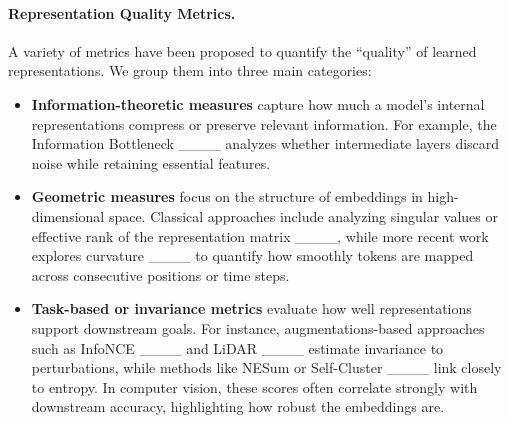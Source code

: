
\paragraph{Representation Quality Metrics.}


A variety of metrics have been proposed to quantify the ``quality'' of learned representations. We group them into three main categories:

\begin{itemize}[itemsep=1pt, topsep=0pt]
    \item \textbf{Information-theoretic measures} capture how much a model's internal representations compress or preserve relevant information. For example, the Information Bottleneck ____ analyzes whether intermediate layers discard noise while retaining essential features.
    
    \item \textbf{Geometric measures} focus on the structure of embeddings in high-dimensional space. Classical approaches include analyzing singular values or effective rank of the representation matrix ____, while more recent work explores curvature ____ to quantify how smoothly tokens are mapped across consecutive positions or time steps.
    
    \item \textbf{Task-based or invariance metrics} evaluate how well representations support downstream goals. For instance, augmentations-based approaches such as InfoNCE ____ and LiDAR ____ estimate invariance to perturbations, while methods like NESum or Self-Cluster ____ link closely to entropy. In computer vision, these scores often correlate strongly with downstream accuracy, highlighting how robust the embeddings are.
\end{itemize}

